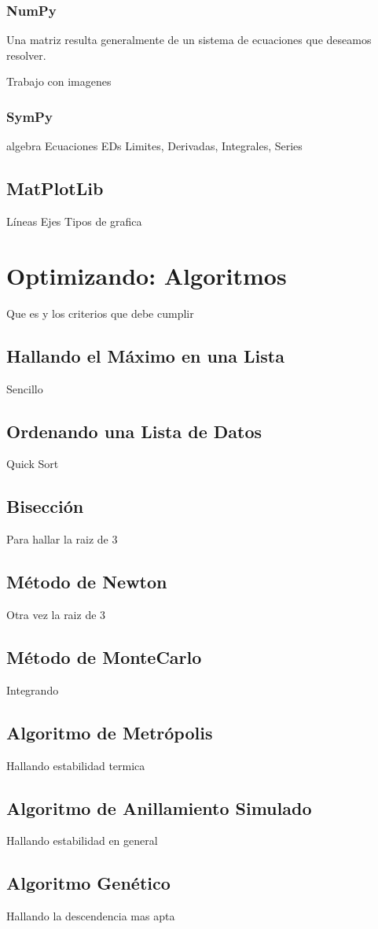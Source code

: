 \documentclass[10pt,letterpaper]{article}
\begin{document}
\subsubsection{NumPy}
Una matriz resulta generalmente de un sistema de ecuaciones que deseamos resolver. 

Trabajo con imagenes
\subsubsection{SymPy}
algebra
Ecuaciones
EDs
Limites, Derivadas, Integrales, Series
\subsection{MatPlotLib}
Líneas
Ejes
Tipos de grafica
\section{Optimizando: Algoritmos}
Que es y los criterios que debe cumplir
\subsection{Hallando el M\'aximo en una Lista}
Sencillo
\subsection{Ordenando una Lista de Datos}
Quick Sort
\subsection{Bisecci\'on}
Para hallar la raiz de 3
\subsection{M\'etodo de Newton}
Otra vez la raiz de 3
\subsection{M\'etodo de MonteCarlo}
Integrando
\subsection{Algoritmo de Metr\'opolis}
Hallando estabilidad termica
\subsection{Algoritmo de Anillamiento Simulado}
Hallando estabilidad en general
\subsection{Algoritmo Gen\'etico}
Hallando la descendencia mas apta
\end{document}
